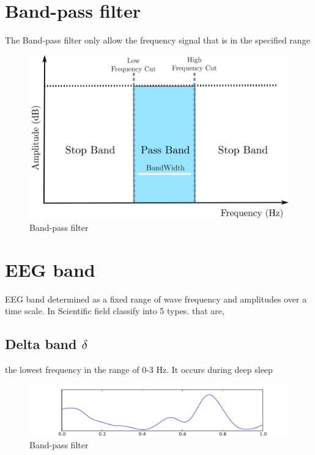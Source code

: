 \section{Band-pass filter}
\hspace{1.5cm}The Band-pass filter only allow the frequency signal that is in the specified range
\begin{figure}[ht]
	\centering
	\includegraphics[scale = 0.14]{chapter3/bandpass.pdf}
	\caption{Band-pass filter}
\end{figure}

\newpage
\section{EEG band}
\hspace{1.5cm}EEG band determined as a fixed range of wave frequency and amplitudes over a time scale. In Scientific field classify into 5 types. that are,

\subsection{Delta band $\delta$} the lowest frequency in the range of 0-3 Hz. It occurs during deep sleep
\begin{figure}[ht]
	\centering
	\includegraphics[scale = 0.14]{chapter3/Eeg_delta.pdf}
	\caption{Band-pass filter}
\end{figure}

